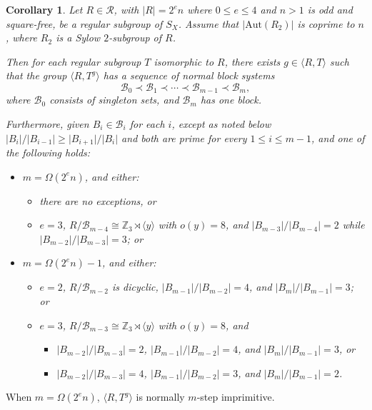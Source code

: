 \documentclass[11pt]{amsart}
\numberwithin{equation}{section}
\newtheorem{cor}[thrm]{Corollary}
\theoremstyle{definition}
\def\la{\langle}
\def\ra{\rangle}
\def\Z{{\mathbb Z}}
\newcommand{\sg}[1]{\langle{#1}\rangle}
\begin{document}
	\begin{cor}\label{111021a}
		Let $R\in {\mathcal  R}$, with  $|R|=2^e n$ where $0\le e\le 4$ and $n >1$ is odd and square-free, be a regular subgroup of $ S_{X}$. Assume that $|\mathrm{Aut}(R_2)|$ is coprime to $n$, where $R_2$ is a Sylow $2$-subgroup of $R$. 
		
		Then for each regular subgroup $T$ isomorphic to $R$, there exists $g\in\sg{R,T}$ such that the group $\sg{R,T^g}$  has a sequence of normal block systems
		$${\mathcal  B}_0\prec{\mathcal  B}_1\prec\cdots\prec{\mathcal  B}_{m - 1}\prec{\mathcal  B}_{m},$$
		where ${\mathcal  B}_0 $ consists of singleton sets, and ${\mathcal  B}_m$ has one block.  
		
		Furthermore, given $B_i\in\mathcal{B}_i$ for each $i$, except as noted below $\vert B_i\vert/\vert B_{i-1}|\ge \vert B_{i+1}\vert/\vert B_i\vert$ and both are prime for every $1\le i \le m-1$, and one of the following holds:
		\begin{itemize}
			\item $m=\Omega(2^en)$, and either:
			\begin{itemize}
				\item there are no exceptions, or
				\item $e=3$, $R/{\mathcal B}_{m-4} \cong \Z_3 \rtimes \sg{y}$ with $o(y)=8$, and $|B_{m-3}|/|B_{m-4}|=2$ while $|B_{m-2}|/|B_{m-3}|=3$; or
			\end{itemize}
			\item $m=\Omega(2^en)-1$, and either:
			\begin{itemize}
				\item $e=2$, $R/{\mathcal  B}_{m-2}$ is dicyclic, $|B_{m-1}|/|B_{m-2}|=4$, and $|B_m|/|B_{m-1}|=3$; or
				\item $e=3$, $R/{\mathcal B}_{m-3} \cong \Z_3 \rtimes \sg{y}$ with $o(y)=8$, and 
				\begin{itemize}
					\item $|B_{m-2}|/|B_{m-3}|=2$, $|B_{m-1}|/|B_{m-2}|=4$, and $|B_{m}|/|B_{m-1}|=3$, or 
					\item $|B_{m-2}|/|B_{m-3}|=4$, $|B_{m-1}|/|B_{m-2}|=3$, and $|B_{m}|/|B_{m-1}|=2$. 
				\end{itemize}
			\end{itemize}
		\end{itemize}
	\end{cor}
	
	When $m = \Omega(2^en)$, $\la R,T^g\ra$ is normally $m$-step imprimitive.
	
\end{document}
